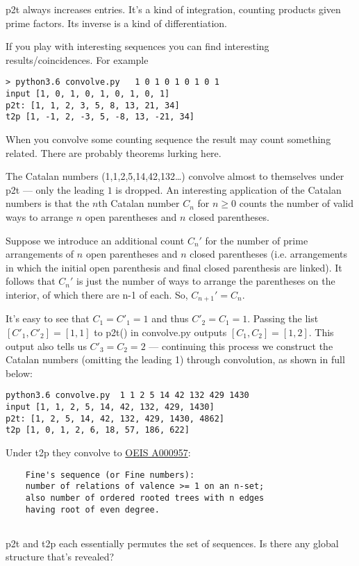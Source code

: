 \documentclass[10pt]{article}
\numberwithin{equation}{section}
\begin{document}
p2t always increases entries. It's a kind of integration, counting products given prime factors. Its inverse is a kind of differentiation. 

If you play with interesting sequences you can find interesting results/coincidences. For example

\begin{verbatim}
> python3.6 convolve.py   1 0 1 0 1 0 1 0 1
input [1, 0, 1, 0, 1, 0, 1, 0, 1]
p2t: [1, 1, 2, 3, 5, 8, 13, 21, 34]
t2p [1, -1, 2, -3, 5, -8, 13, -21, 34]
\end{verbatim}

When you convolve some counting sequence the result may count something related. There are probably theorems lurking here.

The Catalan numbers (1,1,2,5,14,42,132\ldots) convolve almost to themselves under p2t --- only the leading $1$ is dropped. An interesting application of the Catalan numbers is that the $n$th Catalan number $C_n$ for $n\geq 0$ counts the number of valid ways to arrange $n$ open parentheses and $n$ closed parentheses.

Suppose we introduce an additional count $C_n'$ for the number of prime arrangements of $n$ open parentheses and $n$ closed parentheses (i.e. arrangements in which the initial open parenthesis and final closed parenthesis are linked). It follows that $C_n'$ is just the number of ways to arrange the parentheses on the interior, of which there are n-1 of each. So, $C_{n+1}'=C_n$.

It's easy to see that $C_1=C'_1=1$ and thus $C'_2=C_1=1.$ Passing the list $[C'_1, C'_2]=[1,1]$ to p2t() in convolve.py outputs $[C_1, C_2]=[1,2]$. This output also tells us $C'_3=C_2=2$ — continuing this process we construct the Catalan numbers (omitting the leading 1) through convolution, as shown in full below:

\begin{verbatim}
python3.6 convolve.py  1 1 2 5 14 42 132 429 1430
input [1, 1, 2, 5, 14, 42, 132, 429, 1430]
p2t: [1, 2, 5, 14, 42, 132, 429, 1430, 4862]
t2p [1, 0, 1, 2, 6, 18, 57, 186, 622]
\end{verbatim}
 Under t2p they convolve to 
\href{https://oeis.org/A000957}{OEIS A000957}:
\begin{verbatim}
	Fine's sequence (or Fine numbers):
	number of relations of valence >= 1 on an n-set;
	also number of ordered rooted trees with n edges 
	having root of even degree. 
	
\end{verbatim}
p2t and t2p each essentially permutes the set of sequences. Is there any global structure that's revealed?
\end{document}
